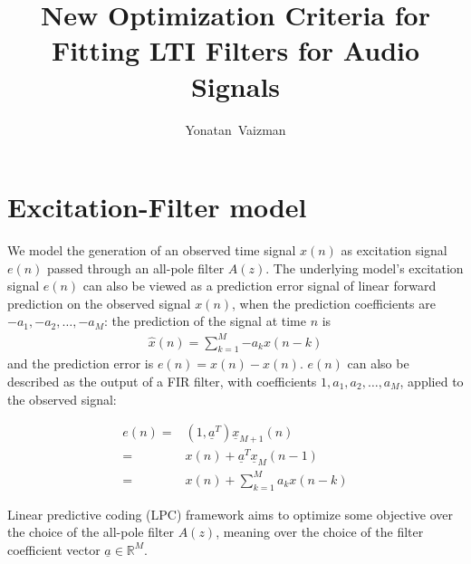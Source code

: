 \documentclass[journal,onecolumn]{IEEEtran}
\newcommand{\field}[1]{\mathbb{#1}}
\begin{document}
%
\title{New Optimization Criteria for Fitting LTI Filters for Audio Signals}
\author{Yonatan~Vaizman}


\maketitle

\section{Excitation-Filter model}
We model the generation of an observed time signal $x(n)$ as excitation signal $e(n)$ passed through an all-pole filter $A(z)$.
The underlying model's excitation signal $e(n)$ can also be viewed as a prediction error signal of linear forward prediction on the observed signal $x(n)$, when the prediction coefficients are $-a_1,-a_2, \ldots, -a_M$: the prediction of the signal at time $n$ is 
\begin{align*}
\widehat{x}(n)=\sum\limits_{k=1}^M{-a_k x(n-k)}
\end{align*}
and the prediction error is $e(n) = x(n) - \widehat{x}(n)$. $e(n)$ can also be described as the output of a FIR filter, with coefficients $1,a_1,a_2,\ldots,a_M$, applied to the observed signal:

\begin{align*}
e(n) = & ({1,\underline{a}^T}) \underline{x}_{M+1}(n) \\
     = & x(n) + \underline{a}^T \underline{x}_{M}(n-1) \\
     = & x(n) + \sum\limits_{k=1}^M{a_k x(n-k)}
\end{align*}

Linear predictive coding (LPC) framework aims to optimize some objective over the choice of the all-pole filter $A(z)$, meaning over the choice of the filter coefficient vector $\underline{a}\in \field{R}^M$.
\end{document}
